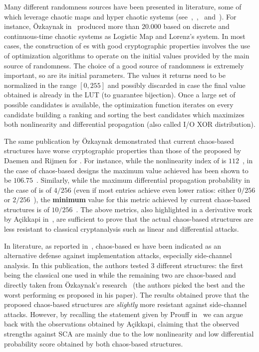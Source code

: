         Many different randomness sources have been presented in literature, some of which leverage chaotic maps and hyper chaotic systems (see~\cite{dimitrov2020design},~\cite{ali2019application},~\cite{tang2005novel} and~\cite{ozkaynak2019chaos}). For instance, Özkaynak in~\cite{ozkaynak2019construction} produced more than $20.000$ \sbocs{} based on discrete and continuous-time chaotic systems as Logistic Map and Lorenz's system. In most cases, the construction of \sbocs{}es with good cryptographic properties involves the use of optimization algorithms to operate on the initial values provided by the main source of randomness. The choice of a good source of randomness is extremely important, so are its initial parameters. The values it returns need to be normalized in the range $[0,255]$ and possibly discarded in case the final value obtained is already in the \sbocs{} LUT (to guarantee bijection). Once a large set of possible \sbocs{} candidates is available, the optimization function iterates on every candidate building a ranking and sorting the best candidates which maximizes both nonlinearity and differential propagation (also called I/O XOR distribution).

        The same publication by Özkaynak demonstrated that current chaos-based \sbocs{} structures have worse cryptographic properties than those of the \sbocs{} proposed by Daemen and Rijmen for \aes{}. For instance, while the nonlinearity index of \aes{} \sbocs{} is $112$~\cite{daemen1999aes}, in the case of chaos-based designs the maximum value achieved has been shown to be $106.75$~\cite{ozkaynak2019construction}. Similarly, while the maximum differential propagation probability in the case of \aes{} \sbocs{} is of $4/256$ (even if most entries achieve even lower ratios: either $0/256$ or $2/256$~\cite{daemen1999aes}), the \textbf{minimum} value for this metric achieved by current chaos-based structures is of $10/256$~\cite{ozkaynak2019construction}. The above metrics, also highlighted in a derivative work by Açikkapi in~\cite{accikkapi2019side}, are sufficient to prove that the actual chaos-based \sbocs{} structures are less resistant to classical cryptanalysis such as linear and differential attacks.

        In literature, as reported in~\cite{accikkapi2019side}, chaos-based \sbocs{}es have been indicated as an alternative defense against implementation attacks, especially side-channel analysis. In this publication, the authors tested 3 different \sbocs{} structures: the first being the classical one used in \aes{} while the remaining two are chaos-based and directly taken from Özkaynak's research~\cite{ozkaynak2019construction} (the authors picked the best and the worst performing \sbocs{}es proposed in his paper). The results obtained prove that the proposed chaos-based \sbocs{} structures are \emph{slightly} more resistant against side-channel attacks. However, by recalling the statement given by Prouff in~\cite{prouff2005dpa} we can argue back with the observations obtained by Açikkapi, claiming that the observed strengths against SCA are mainly due to the low nonlinearity and low differential probability score obtained by both chaos-based structures.
        
